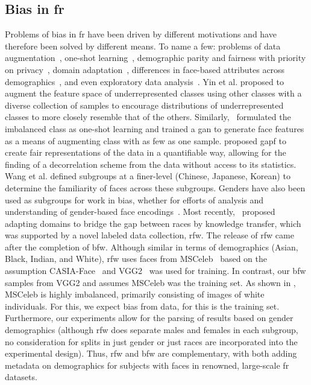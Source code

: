\subsection{Bias in \gls{fr}}
Problems of bias in \gls{fr} have been driven by different motivations and have therefore been solved by different means. To name a few: problems of data augmentation~\cite{yin2019feature}, one-shot learning~\cite{ding2018one}, demographic parity and fairness with priority on privacy~\cite{huang2018generative}, domain adaptation~\cite{wang2018racial}, differences in face-based attributes across demographics~\cite{wang2018they}, and even exploratory data analysis~\cite{muthukumar2019}. Yin et al. \cite{yin2019feature} proposed to augment the feature space of underrepresented classes using other classes with a diverse collection of samples to encourage distributions of underrepresented classes to more closely resemble that of the others. Similarly,~\cite{ding2018one} formulated the imbalanced class as one-shot learning and trained a \gls{gan} to generate face features as a means of augmenting class with as few as one sample. \cite{huang2018generative} proposed \gls{gapf} to create fair representations of the data in a quantifiable way, allowing for the finding of a decorrelation scheme from the data without access to its statistics. Wang et al. \cite{wang2018they} defined subgroups at a finer-level (\ie Chinese, Japanese, Korean) to determine the familiarity of faces across these subgroups. Genders have also been used as subgroups for work in bias, whether for efforts of analysis and understanding of gender-based face encodings~\cite{muthukumar2019}. Most recently,~\cite{wang2018racial} proposed adapting domains to bridge the gap between races by knowledge transfer, which was supported by a novel labeled data collection, \gls{rfw}. The release of \gls{rfw} came after the completion of \gls{bfw}. Although similar in terms of demographics (\ie Asian, Black, Indian, and White), \gls{rfw} uses faces from MSCeleb~\cite{guo2016ms} based on the assumption CASIA-Face~\cite{yi2014learning} and VGG2~\cite{Cao18} was used for training. In contrast, our \gls{bfw} samples from VGG2 and assumes MSCeleb was the training set. As shown in \cite{wang2018racial}, MSCeleb is highly imbalanced, primarily consisting of images of white individuals. For this, we expect bias from data, for this is the training set. Furthermore, our experiments allow for the parsing of results based on gender demographics (\ie although \gls{rfw} does separate males and females in each subgroup, no consideration for splits in just gender or just races are incorporated into the experimental design). Thus, \gls{rfw} and \gls{bfw} are complementary, with both adding metadata on demographics for subjects with faces in renowned, large-scale \gls{fr} datasets.

